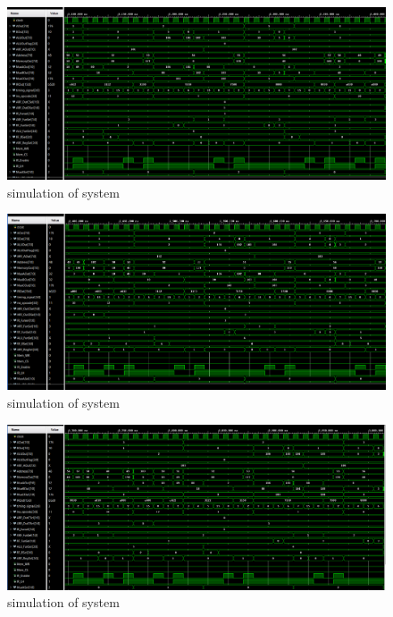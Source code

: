 \documentclass[pdftex,12pt,a4paper]{article}
\begin{document}
\begin{figure}[H]
    \centering
    \includegraphics[width=1\textwidth]{photos/system_result_8.png}	
    \caption{simulation of system}
    \label{implementation}
\end{figure}

\begin{figure}[H]
    \centering
    \includegraphics[width=1\textwidth]{photos/system_result_9.png}	
    \caption{simulation of system}
    \label{implementation}
\end{figure}

\begin{figure}[H]
    \centering
    \includegraphics[width=1\textwidth]{photos/system_result_10.png}	
    \caption{simulation of system}
    \label{implementation}
\end{figure}
\end{document}
